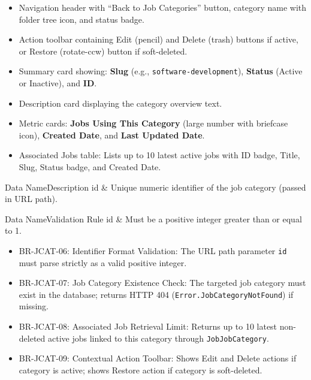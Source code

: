 \begin{itemize}[leftmargin=1.6em,topsep=3pt,itemsep=2pt,parsep=0pt,label=$\bullet$]
    \item Navigation header with ``Back to Job Categories'' button, category name with folder tree icon, and status badge.
    \item Action toolbar containing Edit (pencil) and Delete (trash) buttons if active, or Restore (rotate-ccw) button if soft-deleted.
    \item Summary card showing: \textbf{Slug} (e.g., \texttt{software-development}), \textbf{Status} (Active or Inactive), and \textbf{ID}.
    \item Description card displaying the category overview text.
    \item Metric cards: \textbf{Jobs Using This Category} (large number with briefcase icon), \textbf{Created Date}, and \textbf{Last Updated Date}.
    \item Associated Jobs table: Lists up to 10 latest active jobs with ID badge, Title, Slug, Status badge, and Created Date.
\end{itemize}


\begin{specdatatable}{Data Name}{Description}
id & Unique numeric identifier of the job category (passed in URL path).\\ \hline
\end{specdatatable}

\begin{specdatatable}{Data Name}{Validation Rule}
id & Must be a positive integer greater than or equal to 1.\\ \hline
\end{specdatatable}

\begin{itemize}[leftmargin=1.6em,topsep=3pt,itemsep=2pt,parsep=0pt,label=$\bullet$]\brrulelist
    \item BR-JCAT-06: Identifier Format Validation: The URL path parameter \texttt{id} must parse strictly as a valid positive integer.
    \item BR-JCAT-07: Job Category Existence Check: The targeted job category must exist in the database; returns HTTP 404 (\texttt{Error.JobCategoryNotFound}) if missing.
    \item BR-JCAT-08: Associated Job Retrieval Limit: Returns up to 10 latest non-deleted active jobs linked to this category through \texttt{JobJobCategory}.
    \item BR-JCAT-09: Contextual Action Toolbar: Shows Edit and Delete actions if category is active; shows Restore action if category is soft-deleted.
\end{itemize}

